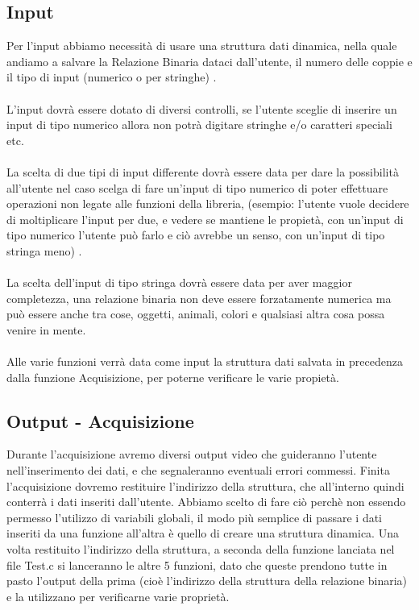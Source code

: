 \documentclass[11pt, a4paper, titlepage, block]{article}
\begin{document}
	\subsection{Input}
	
	
	Per l'input abbiamo necessit\`a di usare una struttura dati dinamica, nella quale andiamo a salvare la Relazione Binaria dataci dall'utente, il numero delle coppie e il tipo di input  (numerico o per stringhe) .\\
	\\
	L'input dovr\`a essere dotato di diversi controlli, se l'utente sceglie di inserire un input di tipo numerico allora non potr\`a digitare stringhe e/o caratteri speciali etc.\\
	\\
	La scelta di due tipi di input differente dovr\`a essere data per dare la possibilit\`a all'utente nel caso scelga di fare un'input di tipo numerico di poter effettuare operazioni non legate alle funzioni della libreria,  (esempio:  l'utente vuole decidere di moltiplicare l'input per due, e vedere se mantiene le propiet\`a, con un'input di tipo numerico l'utente pu\`o farlo e ci\`o avrebbe un senso, con un'input di tipo stringa meno) .\\
	\\
	La scelta dell'input di tipo stringa dovr\`a essere data per aver maggior completezza, una relazione binaria non deve essere forzatamente numerica ma pu\`o essere anche tra cose, oggetti, animali, colori e qualsiasi altra cosa possa venire in mente.\\
	\\
	Alle varie funzioni verr\`a data come input la struttura dati salvata in precedenza dalla funzione Acquisizione, per poterne verificare le varie propiet\`a.\\
	
	
	
	
	\newpage        
	\subsection{Output - Acquisizione}
	Durante l'acquisizione avremo diversi output video che guideranno l'utente nell'inserimento dei dati, e che segnaleranno eventuali errori commessi.
	Finita l'acquisizione dovremo restituire l'indirizzo della struttura, che all'interno quindi conterr\`a  i dati inseriti dall'utente. Abbiamo scelto di fare ci\`o perch\`e non essendo permesso l'utilizzo di variabili globali, il modo pi\`u semplice di passare i dati inseriti da una funzione all'altra \`e  quello di creare una struttura dinamica.
	Una volta restituito l'indirizzo della struttura, a seconda della funzione lanciata nel file Test.c si lanceranno le altre 5 funzioni, dato che queste prendono tutte in pasto l'output della prima  (cio\`e l'indirizzo della struttura della relazione binaria)  e la utilizzano per verificarne varie propriet\`a.\\
	\\
\end{document}
